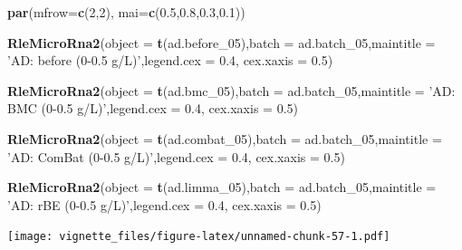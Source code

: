 \documentclass[]{book}
\newenvironment{Shaded}{\begin{snugshade}}{\end{snugshade}}
\newcommand{\KeywordTok}[1]{\textcolor[rgb]{0.13,0.29,0.53}{\textbf{#1}}}
\newcommand{\DataTypeTok}[1]{\textcolor[rgb]{0.13,0.29,0.53}{#1}}
\newcommand{\DecValTok}[1]{\textcolor[rgb]{0.00,0.00,0.81}{#1}}
\newcommand{\FloatTok}[1]{\textcolor[rgb]{0.00,0.00,0.81}{#1}}
\newcommand{\StringTok}[1]{\textcolor[rgb]{0.31,0.60,0.02}{#1}}
\newcommand{\NormalTok}[1]{#1}
\begin{document}
\begin{Shaded}
\begin{Highlighting}[]
\KeywordTok{par}\NormalTok{(}\DataTypeTok{mfrow=}\KeywordTok{c}\NormalTok{(}\DecValTok{2}\NormalTok{,}\DecValTok{2}\NormalTok{), }\DataTypeTok{mai=}\KeywordTok{c}\NormalTok{(}\FloatTok{0.5}\NormalTok{,}\FloatTok{0.8}\NormalTok{,}\FloatTok{0.3}\NormalTok{,}\FloatTok{0.1}\NormalTok{))}

\KeywordTok{RleMicroRna2}\NormalTok{(}\DataTypeTok{object =} \KeywordTok{t}\NormalTok{(ad.before_}\DecValTok{05}\NormalTok{),}\DataTypeTok{batch =}\NormalTok{ ad.batch_}\DecValTok{05}\NormalTok{,}\DataTypeTok{maintitle =} \StringTok{'AD: before (0-0.5 g/L)'}\NormalTok{,}\DataTypeTok{legend.cex =} \FloatTok{0.4}\NormalTok{, }\DataTypeTok{cex.xaxis =} \FloatTok{0.5}\NormalTok{)}

\KeywordTok{RleMicroRna2}\NormalTok{(}\DataTypeTok{object =} \KeywordTok{t}\NormalTok{(ad.bmc_}\DecValTok{05}\NormalTok{),}\DataTypeTok{batch =}\NormalTok{ ad.batch_}\DecValTok{05}\NormalTok{,}\DataTypeTok{maintitle =} \StringTok{'AD: BMC (0-0.5 g/L)'}\NormalTok{,}\DataTypeTok{legend.cex =} \FloatTok{0.4}\NormalTok{, }\DataTypeTok{cex.xaxis =} \FloatTok{0.5}\NormalTok{)}

\KeywordTok{RleMicroRna2}\NormalTok{(}\DataTypeTok{object =} \KeywordTok{t}\NormalTok{(ad.combat_}\DecValTok{05}\NormalTok{),}\DataTypeTok{batch =}\NormalTok{ ad.batch_}\DecValTok{05}\NormalTok{,}\DataTypeTok{maintitle =} \StringTok{'AD: ComBat (0-0.5 g/L)'}\NormalTok{,}\DataTypeTok{legend.cex =} \FloatTok{0.4}\NormalTok{, }\DataTypeTok{cex.xaxis =} \FloatTok{0.5}\NormalTok{)}

\KeywordTok{RleMicroRna2}\NormalTok{(}\DataTypeTok{object =} \KeywordTok{t}\NormalTok{(ad.limma_}\DecValTok{05}\NormalTok{),}\DataTypeTok{batch =}\NormalTok{ ad.batch_}\DecValTok{05}\NormalTok{,}\DataTypeTok{maintitle =} \StringTok{'AD: rBE (0-0.5 g/L)'}\NormalTok{,}\DataTypeTok{legend.cex =} \FloatTok{0.4}\NormalTok{, }\DataTypeTok{cex.xaxis =} \FloatTok{0.5}\NormalTok{)}
\end{Highlighting}
\end{Shaded}

\texttt{[image: vignette\_files/figure-latex/unnamed-chunk-57-1.pdf]}
\end{document}
